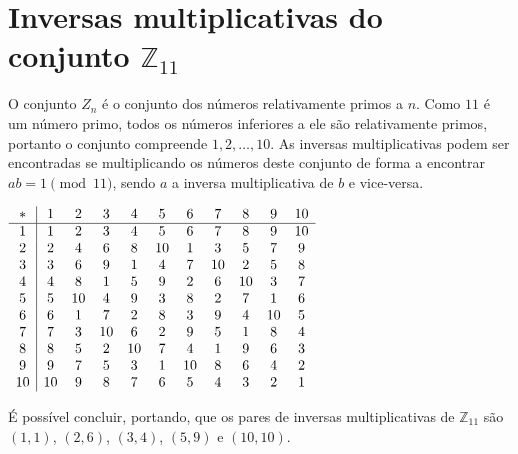 \documentclass[12pt]{article}
\begin{document}
\section{Inversas multiplicativas do conjunto $\mathbb{Z}_{11}$}

O conjunto $Z_{n}$ é o conjunto dos números relativamente primos a $n$. Como
$11$ é um número primo, todos os números inferiores a ele são relativamente
primos, portanto o conjunto compreende ${1, 2, \ldots, 10}$. As inversas
multiplicativas podem ser encontradas se multiplicando os números deste
conjunto de forma a encontrar $ab = 1 \pmod{11}$, sendo $a$ a inversa
multiplicativa de $b$ e vice-versa.

\begin{center}
    $\begin{array}{ c | c c c c c c c c c c }
        *  & 1 & 2 & 3 & 4 & 5 & 6 & 7 & 8 & 9 & 10 \\ \hline
        1  & 1 & 2 & 3 & 4 & 5 & 6 & 7 & 8 & 9 & 10 \\
        2  & 2 & 4 & 6 & 8 & 10 & 1 & 3 & 5 & 7 & 9 \\
        3  & 3 & 6 & 9 & 1 & 4 & 7 & 10 & 2 & 5 & 8 \\
        4  & 4 & 8 & 1 & 5 & 9 & 2 & 6 & 10 & 3 & 7 \\
        5  & 5 & 10 & 4 & 9 & 3 & 8 & 2 & 7 & 1 & 6 \\
        6  & 6 & 1 & 7 & 2 & 8 & 3 & 9 & 4 & 10 & 5 \\
        7  & 7 & 3 & 10 & 6 & 2 & 9 & 5 & 1 & 8 & 4 \\
        8  & 8 & 5 & 2 & 10 & 7 & 4 & 1 & 9 & 6 & 3 \\
        9  & 9 & 7 & 5 & 3 & 1 & 10 & 8 & 6 & 4 & 2 \\
        10 & 10 & 9 & 8 & 7 & 6 & 5 & 4 & 3 & 2 & 1 \\
    \end{array}$
\end{center}

É possível concluir, portando, que os pares de inversas multiplicativas de
$\mathbb{Z}_{11}$ são $(1, 1)$, $(2, 6)$, $(3, 4)$, $(5, 9)$ e $(10, 10)$.

%
%
\end{document}
